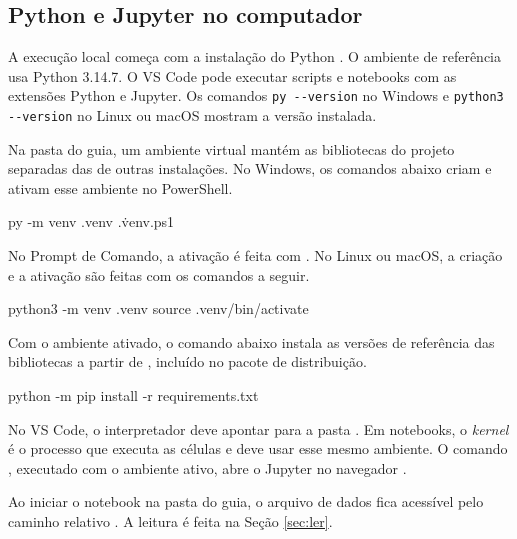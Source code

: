 
\subsection{Python e Jupyter no computador}

A execução local começa com a instalação do Python \cite{python}. O ambiente de referência usa Python 3.14.7. O VS Code pode executar scripts  e notebooks  com as extensões Python e Jupyter. Os comandos \verb|py --version| no Windows e \verb|python3 --version| no Linux ou macOS mostram a versão instalada.

Na pasta do guia, um ambiente virtual mantém as bibliotecas do projeto separadas das de outras instalações. No Windows, os comandos abaixo criam e ativam esse ambiente no PowerShell.

\begin{exemplo}[language={},title={Windows (PowerShell)}]
py -m venv .venv
.\.venv\Scripts\Activate.ps1
\end{exemplo}

No Prompt de Comando, a ativação é feita com . No Linux ou macOS, a criação e a ativação são feitas com os comandos a seguir.

\begin{exemplo}[language={},title={Linux ou macOS}]
python3 -m venv .venv
source .venv/bin/activate
\end{exemplo}

Com o ambiente ativado, o comando abaixo instala as versões de referência das bibliotecas a partir de , incluído no pacote de distribuição.

\begin{exemplo}[language={},title={Terminal}]
python -m pip install -r requirements.txt
\end{exemplo}

No VS Code, o interpretador deve apontar para a pasta . Em notebooks, o \emph{kernel} é o processo que executa as células e deve usar esse mesmo ambiente. O comando , executado com o ambiente ativo, abre o Jupyter no navegador \cite{jupyter}.

Ao iniciar o notebook na pasta do guia, o arquivo de dados fica acessível pelo caminho relativo . A leitura é feita na Seção \ref{sec:ler}.

